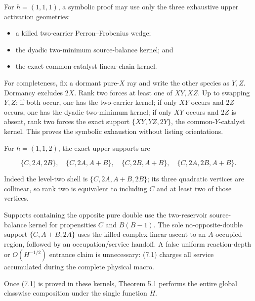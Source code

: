 For \(h=(1,1,1)\), a symbolic proof may use only the three exhaustive
upper activation geometries:

\begin{itemize}
\tightlist
\item
  a killed two-carrier Perron--Frobenius wedge;
\item
  the dyadic two-minimum source-balance kernel; and
\item
  the exact common-catalyst linear-chain kernel.
\end{itemize}

For completeness, fix a dormant pure-\(X\) ray and write the other
species as \(Y,Z\). Dormancy excludes \(2X\). Rank two forces at least
one of \(XY,XZ\). Up to swapping \(Y,Z\): if both occur, one has the
two-carrier kernel; if only \(XY\) occurs and \(2Z\) occurs, one has the
dyadic two-minimum kernel; if only \(XY\) occurs and \(2Z\) is absent,
rank two forces the exact support \(\{XY,YZ,2Y\}\), the
common-\(Y\)-catalyst kernel. This proves the symbolic exhaustion
without listing orientations.

For \(h=(1,1,2)\), the exact upper supports are

\[
 \{C,2A,2B\},\quad \{C,2A,A+B\},\quad
 \{C,2B,A+B\},\quad \{C,2A,2B,A+B\}.                 \tag{7.2}
\]

Indeed the level-two shell is \(\{C,2A,A+B,2B\}\); its three quadratic
vertices are collinear, so rank two is equivalent to including \(C\) and
at least two of those vertices.

Supports containing the opposite pure double use the two-reservoir
source-balance kernel for propensities \(C\) and \(B(B-1)\). The sole
no-opposite-double support \(\{C,A+B,2A\}\) uses the killed-complex
linear ascent to an \(A\)-occupied region, followed by an
occupation/service handoff. A false uniform reaction-depth or
\(O(H^{-1/2})\) entrance claim is unnecessary: (7.1) charges all service
accumulated during the complete physical macro.

Once (7.1) is proved in these kernels, Theorem 5.1 performs the entire
global classwise composition under the single function \(H\).
